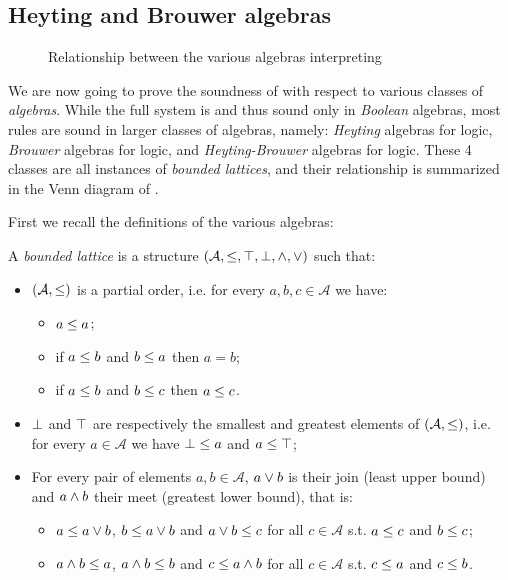 \subsection{Heyting and Brouwer algebras}

\begin{figure*}
  \caption{Relationship between the various algebras interpreting }
\end{figure*}

We are now going to prove the soundness of  with respect to
various classes of \emph{algebras}. While the full system is  and thus
sound only in \emph{Boolean} algebras, most rules are sound in larger classes of
algebras, namely: \emph{Heyting} algebras for  logic,
\emph{Brouwer} algebras for  logic, and
\emph{Heyting-Brouwer} algebras for  logic. These 4 classes are
all instances of \emph{bounded lattices}, and their relationship is summarized
in the Venn diagram of .

First we recall the definitions of the various algebras:

\begin{definition}
  A \emph{bounded lattice} is a structure $(\mathcal{A}, \leq, \top, \bot, \land,
  \lor)$ such that:
  \begin{itemize}
    \item $(\mathcal{A}, \leq)$ is a partial order, i.e. for every $a, b, c
    \in \mathcal{A}$ we have:
      \begin{itemize}
        \item $a \leq a$;
        \item if $a \leq b$ and $b \leq a$ then $a = b$;
        \item if $a \leq b$ and $b \leq c$ then $a \leq c$.
      \end{itemize}
    \item $\bot$ and $\top$ are respectively the smallest and greatest
    elements of $(\mathcal{A}, \leq)$, i.e. for every $a \in \mathcal{A}$ we
    have $\bot \leq a$ and $a \leq \top$;
    \item For every pair of elements $a, b \in \mathcal{A}$, $a \lor b$ is
    their join (least upper bound) and $a \land b$ their meet (greatest lower
    bound), that is:
    \begin{itemize}
      \item $a \leq a \lor b$, $b \leq a \lor b$ and $a \lor b \leq c$ for all $c \in \mathcal{A}$ s.t. $a \leq c$ and $b \leq c$;
      \item $a \land b \leq a$, $a \land b \leq b$ and $c \leq a \land b$ for all $c \in \mathcal{A}$ s.t. $c \leq a$ and $c \leq b$.
    \end{itemize}
  \end{itemize}
\end{definition}

